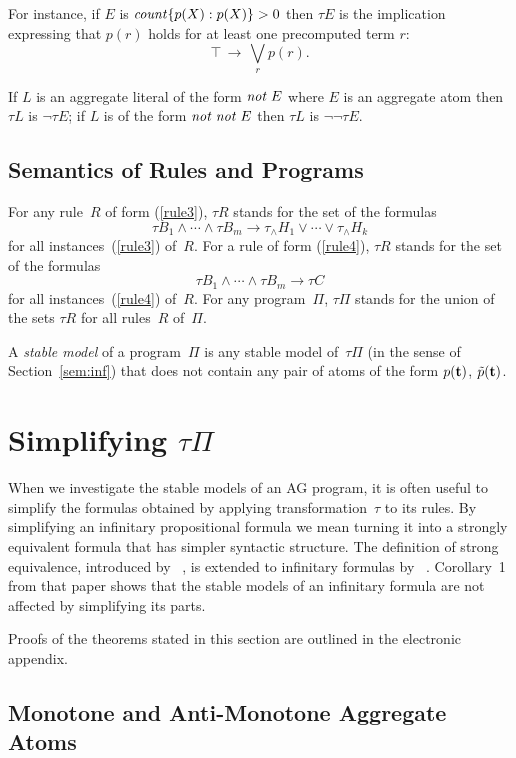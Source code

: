 \documentclass{tlp}
\def\rar{\rightarrow}
\def\no{{\it not}}
\begin{document}
For instance, if $E$ is ${\it count}\{p(X):p(X)\} > 0$ then $\tau E$ is the 
implication expressing that $p(r)$ holds for at least one precomputed term $r$:
$$
\top \,\rar\, \bigvee_r p(r). 
$$


If $L$ is an aggregate literal of the form $\no \; E$ where $E$ is an 
aggregate atom then $\tau L $ is $\neg \tau E$; if $L$ is of the form
$\no \; \no\; E$ then  $\tau L$ is $\neg \neg \tau E$.  

\subsection{Semantics of Rules and Programs} \label{ssec:grules}

For any rule~$R$ of form (\ref{rule3}), $\tau R$ stands for the set of the 
formulas
$$
\tau B_1\land\cdots\land\tau B_m\rar\tau_{\land} H_1\lor\cdots\lor\tau_{\land} H_k
$$
for all instances~(\ref{rule3}) of~$R$.
For a rule of form (\ref{rule4}), $\tau R$ stands for the set of the 
formulas
$$
\tau B_1\land\cdots\land\tau B_m\rar\tau C 
$$
for all instances~(\ref{rule4}) of~$R$.
For any program~$\Pi$, $\tau \Pi$ stands for the union of the sets
$\tau R$ for all rules~$R$ of~$\Pi$.

A {\sl stable model} of a program~$\Pi$
is any stable model of~$\tau\Pi$ (in the sense of Section~\ref{sem:inf})
that does
not contain any pair of atoms of the form $p({\bf t})$, $\tilde{p}({\bf t})$.

\section{Simplifying $\tau\Pi$}

When we investigate the stable models of an AG program, it is often
useful to simplify the formulas obtained by applying transformation~$\tau$ to
its rules.  By simplifying an infinitary propositional formula we mean turning
it into a strongly equivalent formula that has
simpler syntactic structure.  The definition of strong equivalence,
introduced by~ \citeyear{lif01}, is extended to infinitary 
formulas by~ \citeyear{har15a}.  Corollary~1 from that paper 
shows that the stable models of an infinitary formula are not
affected by simplifying its parts.

Proofs of the theorems stated in this section are outlined
in the electronic appendix.

\subsection{Monotone and Anti-Monotone Aggregate Atoms}\label{sec:mon}
\end{document}
